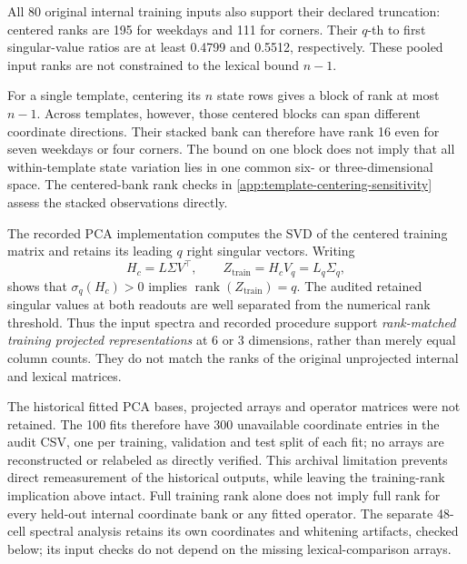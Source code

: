 All 80 original internal training inputs also support their declared truncation: centered ranks are 195 for weekdays and 111 for corners. Their $q$-th to first singular-value ratios are at least 0.4799 and 0.5512, respectively. These pooled input ranks are not constrained to the lexical bound $n-1$.

For a single template, centering its $n$ state rows gives a block of rank at most $n-1$. Across templates, however, those centered blocks can span different coordinate directions. Their stacked bank can therefore have rank 16 even for seven weekdays or four corners. The bound on one block does not imply that all within-template state variation lies in one common six- or three-dimensional space. The centered-bank rank checks in \cref{app:template-centering-sensitivity} assess the stacked observations directly.

The recorded PCA implementation computes the SVD of the centered training matrix and retains its leading $q$ right singular vectors. Writing
\[
 H_c=L\Sigma V^\top,\qquad
 Z_{\mathrm{train}}=H_cV_q=L_q\Sigma_q,
\]
shows that $\sigma_q(H_c)>0$ implies $\operatorname{rank}(Z_{\mathrm{train}})=q$. The audited retained singular values at both readouts are well separated from the numerical rank threshold. Thus the input spectra and recorded procedure support \emph{rank-matched training projected representations} at 6 or 3 dimensions, rather than merely equal column counts. They do not match the ranks of the original unprojected internal and lexical matrices.

The historical fitted PCA bases, projected arrays and operator matrices were not retained. The 100 fits therefore have 300 unavailable coordinate entries in the audit CSV, one per training, validation and test split of each fit; no arrays are reconstructed or relabeled as directly verified. This archival limitation prevents direct remeasurement of the historical outputs, while leaving the training-rank implication above intact. Full training rank alone does not imply full rank for every held-out internal coordinate bank or any fitted operator. The separate 48-cell spectral analysis retains its own coordinates and whitening artifacts, checked below; its input checks do not depend on the missing lexical-comparison arrays.


